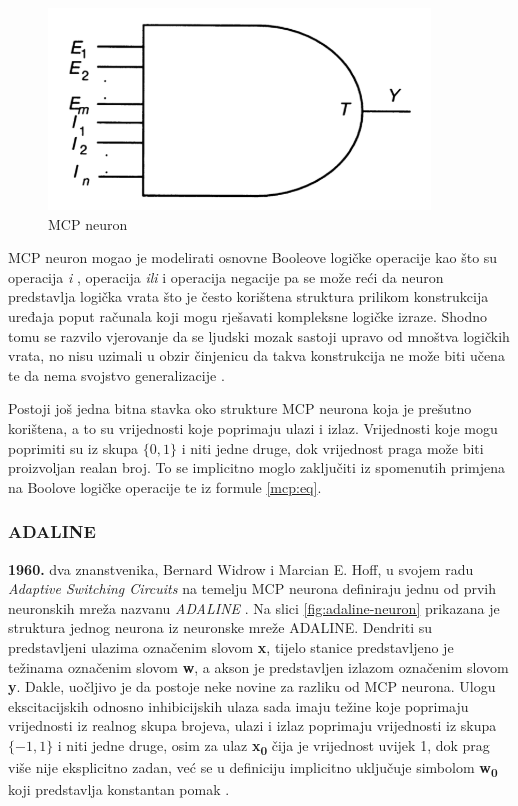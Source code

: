 \documentclass[times, utf8, zavrsni]{fer}
\begin{document}
\begin{figure}[H]
    \centering
    \includegraphics{img/first-ai-neuron.png}
    \caption[Caption for LOF]{MCP neuron\footnotemark}
    \label{fig:first-ai-neuron}
\end{figure}

MCP neuron mogao je modelirati osnovne Booleove logičke operacije kao što su operacija \textit{i} , operacija \textit{ili}  i operacija negacije  pa se može reći da neuron predstavlja logička vrata  što je često korištena struktura prilikom konstrukcija uređaja poput računala koji mogu rješavati kompleksne logičke izraze. Shodno tomu se razvilo vjerovanje da se ljudski mozak sastoji upravo od mnoštva logičkih vrata, no nisu uzimali u obzir činjenicu da takva konstrukcija ne može biti učena te da nema svojstvo generalizacije \citep{picton2000}. 

Postoji još jedna bitna stavka oko strukture MCP neurona koja je prešutno korištena, a to su vrijednosti koje poprimaju ulazi i izlaz. Vrijednosti koje mogu poprimiti su iz skupa $\{0, 1\}$ i niti jedne druge, dok vrijednost praga može biti proizvoljan realan broj. To se implicitno moglo zaključiti iz spomenutih primjena na Boolove logičke operacije te iz formule \eqref{mcp:eq}.

\subsubsection{ADALINE}
\textbf{1960.} dva znanstvenika, Bernard Widrow i Marcian E. Hoff, u svojem radu \textit{Adaptive Switching Circuits} na temelju MCP neurona definiraju jednu od prvih neuronskih mreža nazvanu \textit{ADALINE} . Na slici \ref{fig:adaline-neuron} prikazana je struktura jednog neurona iz neuronske mreže ADALINE. Dendriti su predstavljeni ulazima označenim slovom \textbf{x}, tijelo stanice predstavljeno je težinama označenim slovom \textbf{w}, a akson je predstavljen izlazom označenim slovom \textbf{y}. Dakle, uočljivo je da postoje neke novine za razliku od MCP neurona. Ulogu ekscitacijskih odnosno inhibicijskih ulaza sada imaju težine koje poprimaju vrijednosti iz realnog skupa brojeva, ulazi i izlaz poprimaju vrijednosti iz skupa $\{-1, 1\}$ i niti jedne druge, osim za ulaz \textbf{x\textsubscript{0}} čija je vrijednost uvijek 1, dok prag više nije eksplicitno zadan, već se u definiciju implicitno uključuje simbolom \textbf{w\textsubscript{0}} koji predstavlja konstantan pomak  \citep{picton2000}.
\end{document}
